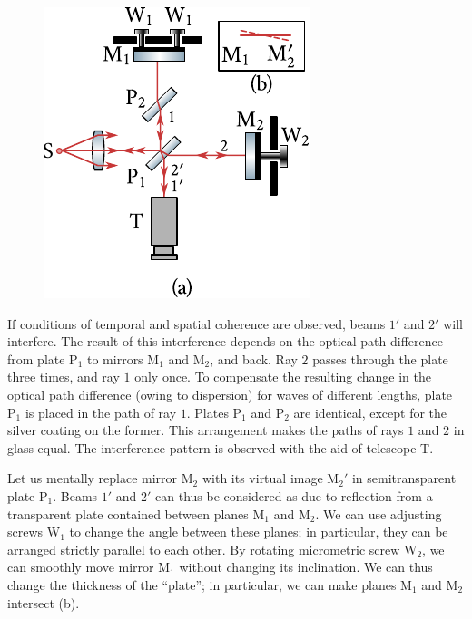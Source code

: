 \begin{figure}[!htb]
	\begin{center}
		\includegraphics[scale=1]{figures/ch_17/fig_17_16.pdf}
		\caption[]{}
		\label{fig:17_16}
	\end{center}
	\vspace{-0.8cm}
\end{figure}

If conditions of temporal and spatial coherence are observed, beams $1'$ and $2'$ will interfere.
The result of this interference depends on the optical path difference from plate P$_1$ to mirrors M$_1$ and M$_2$, and back.
Ray $2$ passes through the plate three times, and ray $1$ only once.
To compensate the resulting change in the optical path difference (owing to dispersion) for waves of different lengths, plate P$_1$ is placed in the path of ray $1$.
Plates P$_1$ and P$_2$ are identical, except for the silver coating on the former.
This arrangement makes the paths of rays $1$ and $2$ in glass equal.
The interference pattern is observed with the aid of telescope T.

Let us mentally replace mirror M$_2$ with its virtual image M$_2'$ in semitransparent plate P$_1$.
Beams $1'$ and $2'$ can thus be considered as due to reflection from a transparent plate contained between planes M$_1$ and M$_2$.
We can use adjusting screws W$_1$ to change the angle between these planes; in particular, they can be arranged strictly parallel to each other.
By rotating micrometric screw W$_2$, we can smoothly move mirror M$_1$ without changing its inclination.
We can thus change the thickness of the ``plate''; in particular, we can make planes M$_1$ and M$_2$ intersect (b).

